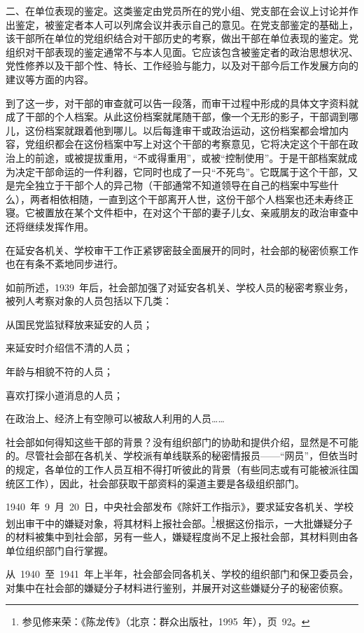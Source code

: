 二、在单位表现的鉴定。这类鉴定由党员所在的党小组、党支部在会议上讨论并作出鉴定，被鉴定者本人可以列席会议并表示自己的意见。在党支部鉴定的基础上，该干部所在单位的党组织结合对干部历史的考察，做出干部在单位表现的鉴定。党组织对干部表现的鉴定通常不与本人见面。它应该包含被鉴定者的政治思想状况、党性修养以及干部个性、特长、工作经验与能力，以及对干部今后工作发展方向的建议等方面的内容。

到了这一步，对干部的审查就可以告一段落，而审干过程中形成的具体文字资料就成了干部的个人档案。从此这份档案就尾随干部，像一个无形的影子，干部调到哪儿，这份档案就跟着他到哪儿。以后每逢审干或政治运动，这份档案都会增加内容，党组织都会在这份档案中写上对这个干部的考察意见，它将决定这个干部在政治上的前途，或被提拔重用，“不或得重用”，或被“控制使用”。于是干部档案就成为决定干部命运的一件利器，它同时也成了一只“不死鸟”。它既属于这个干部，又是完全独立于干部个人的异己物（干部通常不知道领导在自己的档案中写些什么），两者相依相随，一直到这个干部离开人世，这份干部个人档案也还未寿终正寝。它被置放在某个文件柜中，在对这个干部的妻子儿女、亲戚朋友的政治审查中还将继续发挥作用。

在延安各机关、学校审干工作正紧锣密鼓全面展开的同时，社会部的秘密侦察工作也在有条不紊地同步进行。

如前所述，1939~年后，社会部加强了对延安各机关、学校人员的秘密考察业务，被列人考察对象的人员包括以下几类：

从国民党监狱释放来延安的人员；

来延安时介绍信不清的人员；

年龄与相貌不符的人员；

喜欢打探小道消息的人员；

在政治上、经济上有空隙可以被敌人利用的人员……

社会部如何得知这些干部的背景？没有组织部门的协助和提供介绍，显然是不可能的。尽管社会部在各机关、学校派有单线联系的秘密情报员——“网员”，但依当时的规定，各单位的工作人员互相不得打听彼此的背景（有些同志或有可能被派往国统区工作），因此，社会部获取干部资料的渠道主要是各级组织部门。

1940~年~9~月~20~日，中央社会部发布《除奸工作指示》，要求延安各机关、学校划出审干中的嫌疑对象，将其材料上报社会部。\footnote{参见修来荣：《陈龙传》（北京：群众出版社，1995~年），页~92。}根据这份指示，一大批嫌疑分子的材料被集中到社会部，另有一些人，嫌疑程度尚不足上报社会部，其材料则由各单位组织部门自行掌握。

从~1940~至~1941~年上半年，社会部会同各机关、学校的组织部门和保卫委员会，对集中在社会部的嫌疑分子材料进行鉴别，并展开对这些嫌疑分子的秘密侦察。

